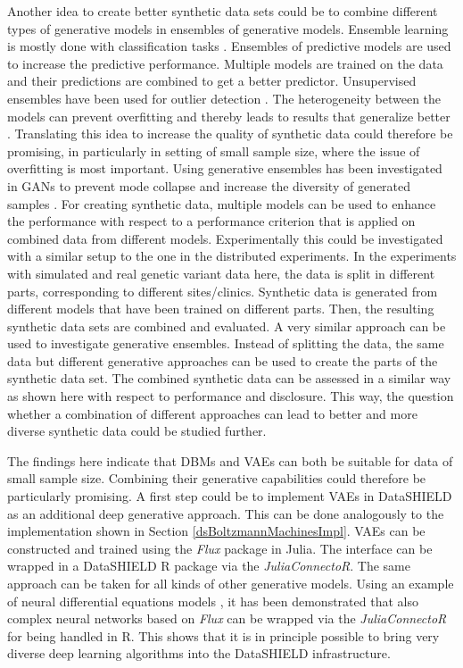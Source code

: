 \documentclass[12pt]{article}
\newcommand{\apkg}[1]{\emph{#1}}
\begin{document}
Another idea to create better synthetic data sets could be to combine different types of generative models in ensembles of generative models.
Ensemble learning is mostly done with classification tasks \citep{ensemble_learning_survey_2018}.
Ensembles of predictive models are used to increase the predictive performance.
Multiple models are trained on the data and their predictions are combined to get a better predictor.
Unsupervised ensembles have been used for outlier detection \citep{unsupervised_outlier}.
The heterogeneity between the models can prevent overfitting and thereby leads to results that generalize better \citep{ensemble_learning_survey_2018}.
Translating this idea to increase the quality of synthetic data could therefore be promising, in particularly in setting of small sample size, where the issue of overfitting is most important.
Using generative ensembles has been investigated in GANs to prevent mode collapse and increase the diversity of generated samples \citep{toutouh_ensemblegan_2020}.
For creating synthetic data, multiple models can be used to enhance the performance with respect to a performance criterion that is applied on combined data from different models.
Experimentally this could be investigated with a similar setup to the one in the distributed experiments.
In the experiments with simulated and real genetic variant data here, the data is split in different parts, corresponding to different sites/clinics.
Synthetic data is generated from different models that have been trained on different parts. Then, the resulting synthetic data sets are combined and evaluated.
A very similar approach can be used to investigate generative ensembles. 
Instead of splitting the data, the same data but different generative approaches can be used to create the parts of the synthetic data set.
The combined synthetic data can be assessed in a similar way as shown here with respect to performance and disclosure.
This way, the question whether a combination of different approaches can lead to better and more diverse synthetic data could be studied further.

The findings here indicate that DBMs and VAEs can both be suitable for data of small sample size.
Combining their generative capabilities could therefore be particularly promising.
A first step could be to implement VAEs in DataSHIELD as an additional deep generative approach.
This can be done analogously to the implementation shown in Section \ref{dsBoltzmannMachinesImpl}.
VAEs can be constructed and trained using the \apkg{Flux} package in Julia.
The interface can be wrapped in a DataSHIELD R package via the \apkg{JuliaConnectoR}.
The same approach can be taken for all kinds of other generative models.
Using an example of neural differential equations models \citep{juliaconnector_2021, chen_neural_2019}, it has been demonstrated that also complex neural networks based on \apkg{Flux} can be wrapped via the \apkg{JuliaConnectoR} for being handled in R.
This shows that it is in principle possible to bring very diverse deep learning algorithms into the DataSHIELD infrastructure.
\end{document}
